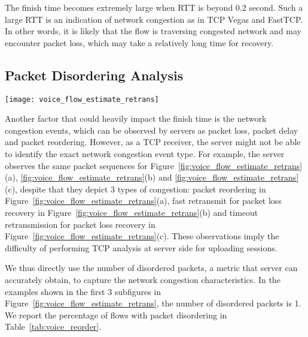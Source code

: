 The finish time becomes extremely large when RTT is beyond 0.2 second. Such a large RTT is an indication of network congestion as in TCP Vegas\cite{brakmo1995tcp} and FastTCP\cite{wei2006fast}. In other words, it is likely that the flow is traversing congested network and may encounter packet loss, which may take a relatively long time for recovery.

\subsection{Packet Disordering Analysis}
\label{sec:v_pd}


\begin{figure*}[th]
\centering
	\texttt{[image: voice\_flow\_estimate\_retrans]}
\caption{Server could not distinguish packet reordering events, which are (a) network reordering, (b) fast retransmit, and (c) timeout retransmission. Server may identify some timeout retransmissions as long packet delay (d).}
\label{fig:voice_flow_estimate_retrans}
\end{figure*}

Another factor that could heavily impact the finish time is the network congestion events, which can be observed by servers as packet loss, packet delay and packet reordering. However, as a TCP receiver, the server might not be able to identify the exact network congestion event type. For example, the server observes the same packet sequences for Figure~\ref{fig:voice_flow_estimate_retrans}(a), \ref{fig:voice_flow_estimate_retrans}(b) and \ref{fig:voice_flow_estimate_retrans}(c), despite that they depict 3 types of congestion: packet reordering in Figure~\ref{fig:voice_flow_estimate_retrans}(a), fast retransmit for packet loss recovery in Figure~\ref{fig:voice_flow_estimate_retrans}(b) and timeout retransmission for packet loss recovery in Figure~\ref{fig:voice_flow_estimate_retrans}(c). These observations imply the difficulty of performing TCP analysis at server side for uploading sessions. 



We thus directly use the number of disordered packets, a metric that server can accurately obtain, to capture the network congestion characteristics. In the examples shown in the first 3 subfigures in Figure~\ref{fig:voice_flow_estimate_retrans}, the number of disordered packets is 1. %
We report the percentage of flows with packet disordering in Table~\ref{tab:voice_reorder}.

